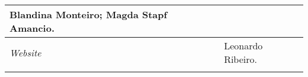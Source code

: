 \documentclass{gescons}
\begin{document}
\begin{longtable}[]{@{}
  >{\raggedright\arraybackslash}p{}
  >{\raggedright\arraybackslash}p{}@{}}
\begin{minipage}[b]{\linewidth}
Blandina Monteiro; Magda Stapf Amancio.
\end{minipage} \\
\hline
\begin{minipage}[b]{\linewidth}\raggedright
\emph{Website}
\end{minipage} & \begin{minipage}[b]{\linewidth}\raggedright
Leonardo Ribeiro.
\end{minipage} \\
\midrule\noalign{}
\endhead
\bottomrule\noalign{}
\endlastfoot
\end{longtable}


        
\end{document}
